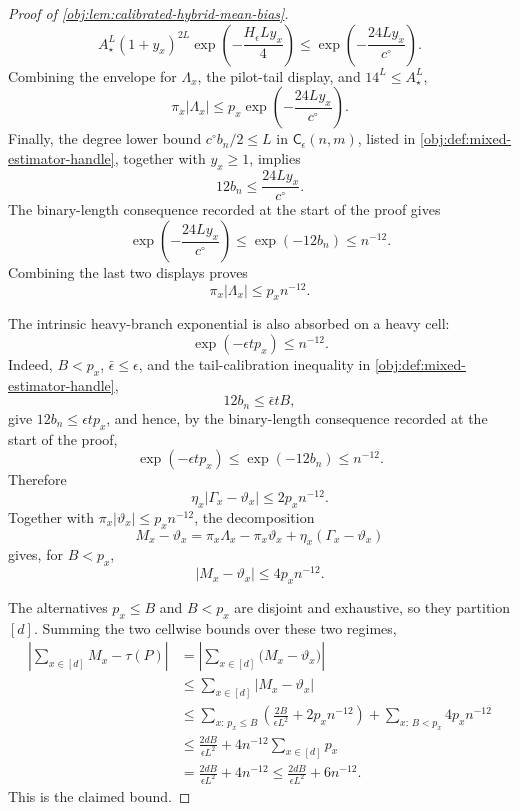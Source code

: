 \documentclass[11pt]{article}
\begin{document}
\begin{proof}[Proof of \cref{obj:lem:calibrated-hybrid-mean-bias}]
\[
A_\star^L(1+y_x)^{2L}
\exp\!\left(-\frac{H_\epsilon Ly_x}{4}\right)
\le
\exp\!\left(-\frac{24Ly_x}{c^\circ}\right).
\]
Combining the envelope for \(\Lambda_x\), the pilot-tail display, and \(14^L\le A_\star^L\),
\[
\pi_x|\Lambda_x|
\le
p_x\exp\!\left(-\frac{24Ly_x}{c^\circ}\right).
\]
Finally, the degree lower bound \(c^\circ b_n/2\le L\) in \(\mathsf C_\epsilon(n,m)\), listed in \cref{obj:def:mixed-estimator-handle}, together with \(y_x\ge1\), implies
\[
12b_n\le \frac{24Ly_x}{c^\circ}.
\]
The binary-length consequence recorded at the start of the proof gives
\[
\exp\!\left(-\frac{24Ly_x}{c^\circ}\right)
\le
\exp(-12b_n)
\le
n^{-12}.
\]
Combining the last two displays proves
\[
\pi_x|\Lambda_x|\le p_xn^{-12}.
\]

The intrinsic heavy-branch exponential is also absorbed on a heavy cell:
\[
\exp(-\epsilon t p_x)
\le
n^{-12}.
\]
Indeed, \(B<p_x\), \(\bar\epsilon\le\epsilon\), and the tail-calibration inequality in \cref{obj:def:mixed-estimator-handle},
\[
12b_n\le \bar\epsilon tB,
\]
give \(12b_n\le \epsilon t p_x\), and hence, by the binary-length consequence recorded at the start of the proof,
\[
\exp(-\epsilon t p_x)\le \exp(-12b_n)\le n^{-12}.
\]
Therefore
\[
\eta_x|\Gamma_x-\vartheta_x|
\le
2p_xn^{-12}.
\]
Together with \(\pi_x|\vartheta_x|\le p_xn^{-12}\), the decomposition
\[
M_x-\vartheta_x
=
\pi_x\Lambda_x-\pi_x\vartheta_x+\eta_x(\Gamma_x-\vartheta_x)
\]
gives, for \(B<p_x\),
\[
|M_x-\vartheta_x|
\le
4p_xn^{-12}.
\]

The alternatives \(p_x\le B\) and \(B<p_x\) are disjoint and exhaustive, so
they partition \([d]\).  Summing the two cellwise bounds over these two regimes,
\[
\begin{aligned}
\left|
\sum_{x\in[d]}M_x-\tau(P)
\right|
&=
\left|
\sum_{x\in[d]}\bigl(M_x-\vartheta_x\bigr)
\right|  \\
&\le
\sum_{x\in[d]}
\left|M_x-\vartheta_x\right| \\
&\le
\sum_{x:\,p_x\le B}
\left(\frac{2B}{\epsilon L^2}+2p_xn^{-12}\right)
+
\sum_{x:\,B<p_x}4p_xn^{-12} \\
&\le
\frac{2dB}{\epsilon L^2}
+4n^{-12}\sum_{x\in[d]}p_x \\
&=
\frac{2dB}{\epsilon L^2}+4n^{-12}
\le
\frac{2dB}{\epsilon L^2}+6n^{-12}.
\end{aligned}
\]
This is the claimed bound. %
\end{proof}
\end{document}
